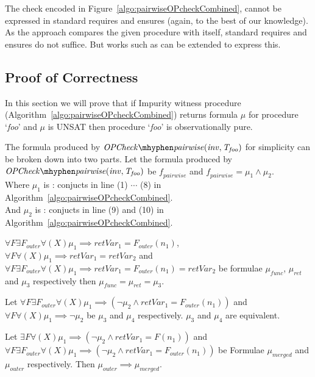 \documentclass{llncs}
\newcommand{\foo}{\textit{foo}}
\newcommand{\inv}{\mathit{inv}}
\newcommand{\pathCondition}{\mathit{T_{\foo}}}
\newcommand{\OPCheckA}{\mathit{OPCheck \mhyphen pairwise}}
\newcommand{\mi}[1]{\mathit{#1}}
\newcommand{\retVar}{\textit{retVar}}
\newcommand{\F}{\mathit{F}}
\newcommand{\n}{\textit{n}}
\newcommand{\formula}{\mu}
\newcommand{\pairFormula}{\mathit{f_{pairwise}}}
\begin{document}
The check encoded in Figure~\ref{algo:pairwiseOPcheckCombined}, cannot
be expressed in standard requires and ensures (again, to the best of
our knowledge). As the approach compares the given procedure with
itself, standard requires and ensures do not suffice. But works such as
\cite{lahiri2013differential} can be extended to express this. 

\subsection{Proof of Correctness}
In this section we will prove that if Impurity witness procedure
(Algorithm~\ref{algo:pairwiseOPcheckCombined}) returns formula
$\formula$ for procedure `\foo' and $\formula$ is UNSAT then procedure
`\foo' is observationally pure.

The formula produced by $\OPCheckA \mi{(\inv, \pathCondition)}$
for \label{opcheckBreakdown} simplicity can be broken down into two
parts. Let the formula produced by $\OPCheckA \mi{(\inv,
  \pathCondition)}$ be $\pairFormula$ and $\pairFormula = \formula_1
\wedge \formula_2$.\\
Where $\formula_1$ is : conjucts in line (1) $\cdots$ (8) in
Algorithm~\ref{algo:pairwiseOPcheckCombined}.\\
And $\formula_2$ is : conjucts in line (9) and (10) in
Algorithm~\ref{algo:pairwiseOPcheckCombined}.\\

\begin{lemma}\label{lemma:funcRef}
  $\forall \F \exists \F_{outer} \forall (X) \formula_1 \implies
  \retVar_1 = \F_{outer}(n_1)$, $\forall \F \forall(X) \formula_1
  \implies \retVar_1 = \retVar_2$ and $\forall \F \exists \F_{outer}
  \forall (X) \formula_1 \implies \retVar_1 = \F_{outer}(n_1) =
  \retVar_2$ be formulae $\formula_{func}$, $\formula_{ret}$ and $\formula_3$
  respectively then $\formula_{func} = \formula_{ret} = \formula_3$.
\end{lemma}

\begin{lemma}\label{lemma:forAllOuterAInner}
  Let $\forall \F \exists \F_{outer} \forall (X) \formula_1
  \implies (\neg \formula_2 \wedge \retVar_1 = \F_{outer}(\n_1))$ and
  $\forall \F \forall (X) \formula_1 \implies \neg \formula_2$ be
  $\formula_3$ and $\formula_4$ respectively. $\formula_3$ and
  $\formula_4$ are equivalent.
\end{lemma}

\begin{lemma}\label{lemma:combiningF}
  Let $\exists \F \forall (X) \formula_1 \implies (\neg \formula_2
  \wedge \retVar_1 = \F(\n_1))$ and $\forall \F \exists \F_{outer}
  \forall (X) \formula_1 \implies (\neg \formula_2 \wedge \retVar_1 =
  \F_{outer}(\n_1))$ be Formulae $\formula_{merged}$ and
  $\formula_{outer}$ respectively. Then $\formula_{outer} \implies
  \formula_{merged}$.
\end{lemma}
\end{document}
